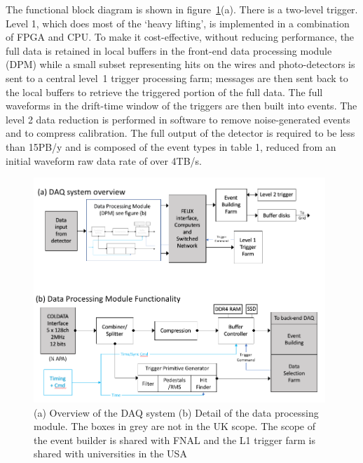 The functional block diagram is shown in figure~\ref{fig:DAQBlock}(a).  There 
is a two-level trigger.  Level 1, which does most of the `heavy lifting', is 
implemented in a combination of FPGA and CPU.  To make it cost-effective, 
without reducing performance, the full data is retained in local buffers 
in the front-end data processing module (DPM) while a small subset
representing hits on the wires and photo-detectors is sent to a central
level~1 trigger processing farm; messages are then sent back to the local
buffers to retrieve the triggered portion of the full data.  The full
waveforms in the drift-time window of the triggers are then built into
events.  The level 2 data reduction is performed in software to remove
noise-generated events and to compress calibration.  The full output
of the detector is required to be less than 15PB/y and is composed of
the event types in table 1, reduced from an initial waveform raw data
rate of over 4TB/s.

\begin{figure}[tb]
    \centering
    \includegraphics[width=0.98\textwidth]{figs/WP2/DAQBlockDiag.png}
    \caption{(a) Overview of the DAQ system (b) Detail of the data processing module.  The boxes in grey are not in the UK scope.  The scope of the event builder is shared with FNAL and the L1 trigger farm is shared with universities in the USA}
    \label{fig:DAQBlock}
\end{figure}

